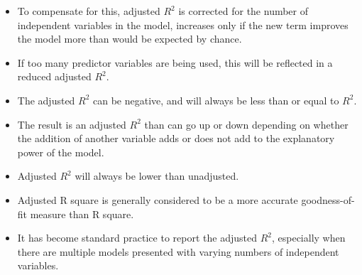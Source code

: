 \documentclass[PredictiveAnalytics101.tex]{subfiles}
\begin{document}
\begin{frame}
	\Large
	\begin{itemize}
		\item To compensate for this, adjusted $R^2$  is corrected for the number of independent variables in the model, increases only if the new term improves the model more than would be expected by chance. 
		\item If too many predictor variables are being used, this will be reflected in a reduced adjusted $R^2$. 
		\item The adjusted $R^2$ can be negative, and will always be less than or equal to $R^2$. 
		\item The result is an adjusted $R^2$ than can go up or down depending on whether the addition of another variable adds or does not add to the explanatory power of the model. \item Adjusted $R^2$ will always be lower than unadjusted.
	\end{itemize}
\end{frame}



\begin{frame}
	\Large
	\begin{itemize}
		\item Adjusted R square is generally considered to be a more accurate goodness-of-fit measure than R square. 
		\item It has become standard practice to report the adjusted $R^2$, especially when there are multiple models presented with varying numbers of independent variables.
	\end{itemize}
\end{frame}
%
%
%
%
%
%
%
\end{document}
